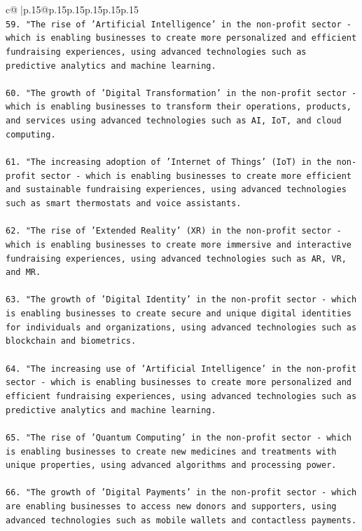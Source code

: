 \documentclass{article}
\begin{document}
{\begin{supertabular}{c@{$\;$}|p{.15\linewidth}@{}p{.15\linewidth}p{.15\linewidth}p{.15\linewidth}p{.15\linewidth}p{.15\linewidth}}
{{{\\ 
\texttt{59. "The rise of 'Artificial Intelligence' in the non{-}profit sector {-} which is enabling businesses to create more personalized and efficient fundraising experiences, using advanced technologies such as predictive analytics and machine learning.} \\
\\ 
\texttt{60. "The growth of 'Digital Transformation' in the non{-}profit sector {-} which is enabling businesses to transform their operations, products, and services using advanced technologies such as AI, IoT, and cloud computing.} \\
\\ 
\texttt{61. "The increasing adoption of 'Internet of Things' (IoT) in the non{-}profit sector {-} which is enabling businesses to create more efficient and sustainable fundraising experiences, using advanced technologies such as smart thermostats and voice assistants.} \\
\\ 
\texttt{62. "The rise of 'Extended Reality' (XR) in the non{-}profit sector {-} which is enabling businesses to create more immersive and interactive fundraising experiences, using advanced technologies such as AR, VR, and MR.} \\
\\ 
\texttt{63. "The growth of 'Digital Identity' in the non{-}profit sector {-} which is enabling businesses to create secure and unique digital identities for individuals and organizations, using advanced technologies such as blockchain and biometrics.} \\
\\ 
\texttt{64. "The increasing use of 'Artificial Intelligence' in the non{-}profit sector {-} which is enabling businesses to create more personalized and efficient fundraising experiences, using advanced technologies such as predictive analytics and machine learning.} \\
\\ 
\texttt{65. "The rise of 'Quantum Computing' in the non{-}profit sector {-} which is enabling businesses to create new medicines and treatments with unique properties, using advanced algorithms and processing power.} \\
\\ 
\texttt{66. "The growth of 'Digital Payments' in the non{-}profit sector {-} which are enabling businesses to access new donors and supporters, using advanced technologies such as mobile wallets and contactless payments.} \\
}}}
\end{supertabular}}
\end{document}
